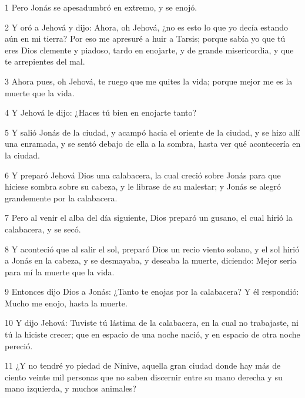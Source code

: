 \par 1 Pero Jonás se apesadumbró en extremo, y se enojó.
\par 2 Y oró a Jehová y dijo: Ahora, oh Jehová, ¿no es esto lo que yo decía estando aún en mi tierra? Por eso me apresuré a huir a Tarsis; porque sabía yo que tú eres Dios clemente y piadoso, tardo en enojarte, y de grande misericordia, y que te arrepientes del mal.
\par 3 Ahora pues, oh Jehová, te ruego que me quites la vida; porque mejor me es la muerte que la vida.
\par 4 Y Jehová le dijo: ¿Haces tú bien en enojarte tanto?
\par 5 Y salió Jonás de la ciudad, y acampó hacia el oriente de la ciudad, y se hizo allí una enramada, y se sentó debajo de ella a la sombra, hasta ver qué acontecería en la ciudad.
\par 6 Y preparó Jehová Dios una calabacera, la cual creció sobre Jonás para que hiciese sombra sobre su cabeza, y le librase de su malestar; y Jonás se alegró grandemente por la calabacera.
\par 7 Pero al venir el alba del día siguiente, Dios preparó un gusano, el cual hirió la calabacera, y se secó.
\par 8 Y aconteció que al salir el sol, preparó Dios un recio viento solano, y el sol hirió a Jonás en la cabeza, y se desmayaba, y deseaba la muerte, diciendo: Mejor sería para mí la muerte que la vida.
\par 9 Entonces dijo Dios a Jonás: ¿Tanto te enojas por la calabacera? Y él respondió: Mucho me enojo, hasta la muerte.
\par 10 Y dijo Jehová: Tuviste tú lástima de la calabacera, en la cual no trabajaste, ni tú la hiciste crecer; que en espacio de una noche nació, y en espacio de otra noche pereció.
\par 11 ¿Y no tendré yo piedad de Nínive, aquella gran ciudad donde hay más de ciento veinte mil personas que no saben discernir entre su mano derecha y su mano izquierda, y muchos animales?

